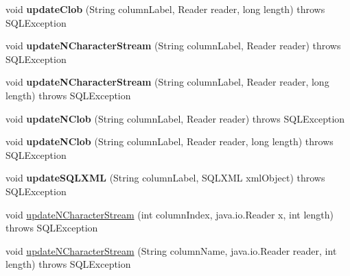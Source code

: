 \begin{DoxyCompactItemize}
\mbox{\label{classcom_1_1mysql_1_1jdbc_1_1_j_d_b_c4_updatable_result_set_ab79990fcd8b8d9b29d9a7d2950982520}} 
void {\bfseries update\+Clob} (String column\+Label, Reader reader, long length)  throws S\+Q\+L\+Exception 
\item 
\mbox{\label{classcom_1_1mysql_1_1jdbc_1_1_j_d_b_c4_updatable_result_set_adc2d097da01d26a81cff6c0256fd2b16}} 
void {\bfseries update\+N\+Character\+Stream} (String column\+Label, Reader reader)  throws S\+Q\+L\+Exception 
\item 
\mbox{\label{classcom_1_1mysql_1_1jdbc_1_1_j_d_b_c4_updatable_result_set_a8a7825190137f6af54d582576daeb8de}} 
void {\bfseries update\+N\+Character\+Stream} (String column\+Label, Reader reader, long length)  throws S\+Q\+L\+Exception 
\item 
\mbox{\label{classcom_1_1mysql_1_1jdbc_1_1_j_d_b_c4_updatable_result_set_a33fb7b5d0da457f746c6f39950ec9c12}} 
void {\bfseries update\+N\+Clob} (String column\+Label, Reader reader)  throws S\+Q\+L\+Exception 
\item 
\mbox{\label{classcom_1_1mysql_1_1jdbc_1_1_j_d_b_c4_updatable_result_set_a3ae663f96603b0832f82797d625c30c6}} 
void {\bfseries update\+N\+Clob} (String column\+Label, Reader reader, long length)  throws S\+Q\+L\+Exception 
\item 
\mbox{\label{classcom_1_1mysql_1_1jdbc_1_1_j_d_b_c4_updatable_result_set_af282f336bfc4bbc3b7dba25afc58b015}} 
void {\bfseries update\+S\+Q\+L\+X\+ML} (String column\+Label, S\+Q\+L\+X\+ML xml\+Object)  throws S\+Q\+L\+Exception 
\item 
void \mbox{\hyperlink{classcom_1_1mysql_1_1jdbc_1_1_j_d_b_c4_updatable_result_set_a37b65317e041f183ae3cb6b643d1fd27}{update\+N\+Character\+Stream}} (int column\+Index, java.\+io.\+Reader x, int length)  throws S\+Q\+L\+Exception 
\item 
void \mbox{\hyperlink{classcom_1_1mysql_1_1jdbc_1_1_j_d_b_c4_updatable_result_set_a2c182eddfce868d7a0af6c9504f67191}{update\+N\+Character\+Stream}} (String column\+Name, java.\+io.\+Reader reader, int length)  throws S\+Q\+L\+Exception 

\end{DoxyCompactItemize}
